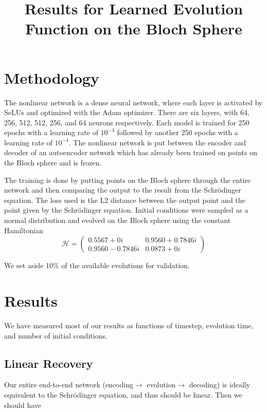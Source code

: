 \documentclass[11pt]{article} %
\title{Results for Learned Evolution Function on the Bloch Sphere}
\date{} %
\numberwithin{equation}{section}  %
\begin{document}
\maketitle



\begin{multicols}{2}

\section{Methodology}
The nonlinear network is a dense neural network, where each layer is activated by SeLUs and optimized with the Adam optimizer.  There are six layers, with 64, 256, 512, 512, 256, and 64 neurons respectively.  Each model is trained for 250 epochs with a learning rate of $10^{-3}$ followed by another 250 epochs with a learning rate of $10^{-4}$.  The nonlinear network is put between the encoder and decoder of an autoencoder network which has already been trained on points on the Bloch sphere and is frozen.  

The training is done by putting points on the Bloch sphere through the entire network and then comparing the output to the result from the Schr\"odinger equation.  The loss used is the L2 distance between the output point and the point given by the Schr\"odinger equation.  Initial conditions were sampled as a normal distribution and evolved on the Bloch sphere using the constant Hamiltonian
\[\mathcal{H} = \begin{pmatrix}
	0.5567+0i & 0.9560+0.7846i\\
	0.9560-0.7846i & 0.0873+0i
\end{pmatrix}\]

We set aside 10\% of the available evolutions for validation.   



\section{Results}
We have measured most of our results as functions of timestep, evolution time, and number of initial conditions.

\subsection{Linear Recovery}
Our entire end-to-end network (encoding$\to$ evolution$\to$ decoding) is ideally equivalent to the Schr\"odinger equation, and thus should be linear.  Then we should have


\end{multicols}
\end{document}
